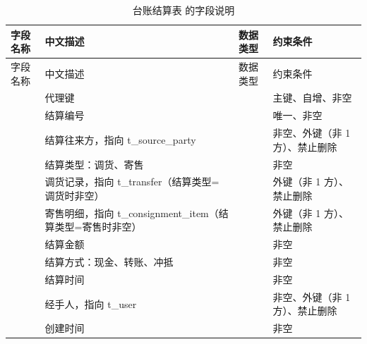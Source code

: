 \begin{longtable}{@{}L{3.5cm} L{4.1cm} L{2.9cm} L{4.0cm}@{}}
\caption{台账结算表  的字段说明}\label{tab:f-t-settlement}\\
\toprule
字段名称 & 中文描述 & 数据类型 & 约束条件 \\
\midrule
\endfirsthead
\toprule
字段名称 & 中文描述 & 数据类型 & 约束条件 \\
\midrule
\endhead
\bottomrule
\endlastfoot
{} & 代理键 &  & 主键、自增、非空 \\
 & 结算编号 &  & 唯一、非空 \\
 & 结算往来方，指向 t\_source\_party &  & 非空、外键（非 1 方）、禁止删除 \\
 & 结算类型：调货、寄售 &  & 非空 \\
 & 调货记录，指向 t\_transfer（结算类型=调货时非空） &  & 外键（非 1 方）、禁止删除 \\
 & 寄售明细，指向 t\_consignment\_item（结算类型=寄售时非空） &  & 外键（非 1 方）、禁止删除 \\
 & 结算金额 &  & 非空 \\
 & 结算方式：现金、转账、冲抵 &  & 非空 \\
 & 结算时间 &  & 非空 \\
 & 经手人，指向 t\_user &  & 非空、外键（非 1 方）、禁止删除 \\
 & 创建时间 &  & 非空 \\
\end{longtable}

